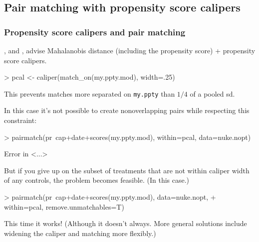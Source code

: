 \subsection[PS calipers]{Pair matching with propensity score calipers}
\begin{frame}[fragile]
  \frametitle{Propensity score calipers and pair matching}
\citet{rosenbaum:rubi:1985a}, and \citet{rubin:thom:2000}, advise Mahalanobis distance (including the propensity score) + propensity score calipers.
\begin{Schunk}
\begin{Sinput}
> pcal <-  caliper(match_on(my.ppty.mod), width=.25)
\end{Sinput}
\end{Schunk}
\pause %

This prevents matches more separated on \texttt{my.ppty} than $1/4$ of
a pooled sd.  \pause 

In this case it's not possible to create nonoverlapping
pairs while respecting this constraint: {%
\begin{Schunk}
\begin{Sinput}
> pairmatch(pr~cap+date+scores(my.ppty.mod), within=pcal, data=nuke.nopt) 
\end{Sinput}
\end{Schunk}
\begin{Schunk}
\begin{Soutput}
Error in <...>
\end{Soutput}
\end{Schunk}
}
\pause
But if you give up on the subset of
treatments that are not within caliper width of any controls, the problem becomes feasible. (In this case.) {%
\begin{Schunk}
\begin{Sinput}
> pairmatch(pr~cap+date+scores(my.ppty.mod), data=nuke.nopt,
+                within=pcal, remove.unmatchables=T) 
\end{Sinput}
\end{Schunk}
\pause 
This time it works! (Although it doesn't always.  More general solutions include widening the caliper and matching more flexibly.) } %
\end{frame}


